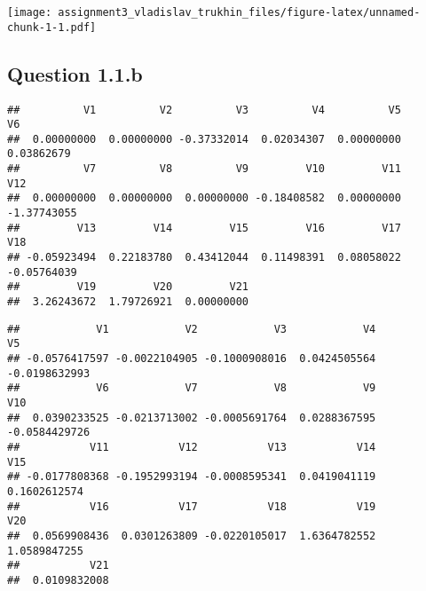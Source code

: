 \documentclass[
]{article}
\newenvironment{Shaded}{\begin{snugshade}}{\end{snugshade}}
\newcommand{\CommentTok}[1]{\textcolor[rgb]{0.56,0.35,0.01}{\textit{#1}}}
\newcommand{\NormalTok}[1]{#1}
\newcommand{\SpecialCharTok}[1]{\textcolor[rgb]{0.00,0.00,0.00}{#1}}
\newcommand{\StringTok}[1]{\textcolor[rgb]{0.31,0.60,0.02}{#1}}
\begin{document}
\texttt{[image: assignment3\_vladislav\_trukhin\_files/figure-latex/unnamed-chunk-1-1.pdf]}

\hypertarget{question-1.1.b}{%
\subsection{Question 1.1.b}\label{question-1.1.b}}

\begin{Shaded}
\end{Shaded}

\begin{verbatim}
##          V1          V2          V3          V4          V5          V6 
##  0.00000000  0.00000000 -0.37332014  0.02034307  0.00000000  0.03862679 
##          V7          V8          V9         V10         V11         V12 
##  0.00000000  0.00000000  0.00000000 -0.18408582  0.00000000 -1.37743055 
##         V13         V14         V15         V16         V17         V18 
## -0.05923494  0.22183780  0.43412044  0.11498391  0.08058022 -0.05764039 
##         V19         V20         V21 
##  3.26243672  1.79726921  0.00000000
\end{verbatim}

\begin{Shaded}
\end{Shaded}

\begin{verbatim}
##            V1            V2            V3            V4            V5 
## -0.0576417597 -0.0022104905 -0.1000908016  0.0424505564 -0.0198632993 
##            V6            V7            V8            V9           V10 
##  0.0390233525 -0.0213713002 -0.0005691764  0.0288367595 -0.0584429726 
##           V11           V12           V13           V14           V15 
## -0.0177808368 -0.1952993194 -0.0008595341  0.0419041119  0.1602612574 
##           V16           V17           V18           V19           V20 
##  0.0569908436  0.0301263809 -0.0220105017  1.6364782552  1.0589847255 
##           V21 
##  0.0109832008
\end{verbatim}
\end{document}
